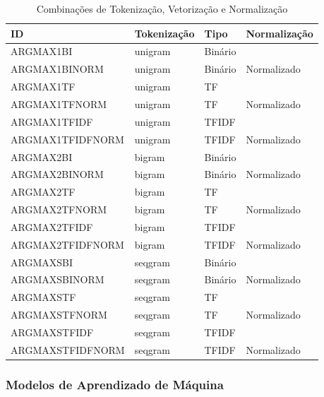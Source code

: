 \begin{table}[H]
\centering
\caption{Combinações de Tokenização, Vetorização e Normalização}
\label{tab:combinacoes}
\begin{tabular}{l|l|l|l}
\hline
\textbf{ID} & \textbf{Tokenização} & \textbf{Tipo} & \textbf{Normalização} \\ \hline
ARGMAX1BI            & unigram     & Binário &               \\ \hline
ARGMAX1BINORM        & unigram     & Binário & Normalizado   \\ \hline
ARGMAX1TF            & unigram     & TF      &               \\ \hline
ARGMAX1TFNORM        & unigram     & TF      & Normalizado   \\ \hline
ARGMAX1TFIDF         & unigram     & TFIDF   &               \\ \hline
ARGMAX1TFIDFNORM     & unigram     & TFIDF   & Normalizado   \\ \hline
ARGMAX2BI            & bigram      & Binário &               \\ \hline
ARGMAX2BINORM        & bigram      & Binário & Normalizado   \\ \hline
ARGMAX2TF            & bigram      & TF      &               \\ \hline
ARGMAX2TFNORM        & bigram      & TF      & Normalizado   \\ \hline
ARGMAX2TFIDF         & bigram      & TFIDF   &               \\ \hline
ARGMAX2TFIDFNORM     & bigram      & TFIDF   & Normalizado   \\ \hline
ARGMAXSBI            & seqgram     & Binário &               \\ \hline
ARGMAXSBINORM        & seqgram     & Binário & Normalizado   \\ \hline
ARGMAXSTF            & seqgram     & TF      &               \\ \hline
ARGMAXSTFNORM        & seqgram     & TF      & Normalizado   \\ \hline
ARGMAXSTFIDF         & seqgram     & TFIDF   &               \\ \hline
ARGMAXSTFIDFNORM     & seqgram     & TFIDF   & Normalizado   \\ \hline
\end{tabular}
\end{table}

\subsubsection{Modelos de Aprendizado de Máquina}

